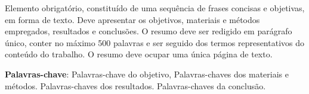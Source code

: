 Elemento obrigatório, constituído de uma sequência de frases concisas e objetivas, em forma de texto.
Deve apresentar os objetivos, materiais e métodos empregados, resultados e conclusões. O resumo deve ser redigido em parágrafo único, conter no máximo 500 palavras e ser seguido dos termos representativos do conteúdo do trabalho. O resumo deve ocupar uma única página de texto.
\vfill

\noindent \textbf{Palavras-chave}: Palavras-chave do objetivo, Palavras-chaves dos materiais e métodos. Palavras-chaves dos resultados. Palavras-chaves da conclusão.
